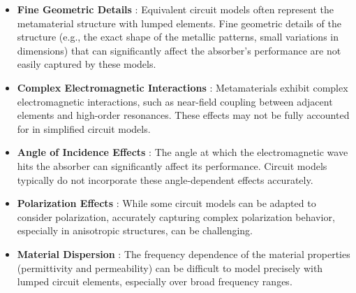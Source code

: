         \begin{itemize}
            \item \textbf{Fine Geometric Details} : Equivalent circuit models often represent the 
                metamaterial structure with lumped elements. Fine geometric details of the 
                structure (e.g., the exact shape of the metallic patterns, small variations in
                dimensions) that can significantly affect the absorber's performance are not 
                easily captured by these models.
            \item \textbf{Complex Electromagnetic Interactions} : Metamaterials exhibit complex
                electromagnetic interactions, such as near-field coupling between adjacent 
                elements and high-order resonances. These effects may not be fully accounted for 
                in simplified circuit models.
            \item \textbf{Angle of Incidence Effects} : The angle at which the electromagnetic 
                wave hits the absorber can significantly affect its performance. Circuit models
                typically do not incorporate these angle-dependent effects accurately.
            \item \textbf{Polarization Effects} : While some circuit models can be adapted to 
                consider polarization, accurately capturing complex polarization behavior, 
                especially in anisotropic structures, can be challenging.
            \item \textbf{Material Dispersion} : The frequency dependence of the material 
                properties (permittivity and permeability) can be difficult to model precisely 
                with lumped circuit elements, especially over broad frequency ranges.
        \end{itemize}

